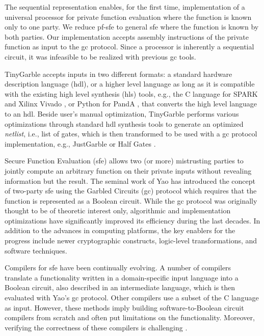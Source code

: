 The sequential representation enables, for the first time, implementation of a universal processor for private function evaluation where the function is known only to one party.
We reduce \acrfull{pf-sfe} to general \acrshort{sfe} where the function is known by both parties.
Our implementation accepts assembly instructions of the private function as input to the \acrshort{gc} protocol.
Since a processor is inherently a sequential circuit, it was infeasible to be realized with previous \acrshort{gc} tools.

TinyGarble accepts inputs in two different formats: a standard hardware description language (\acrshort{hdl}), or a higher level language as long as it is compatible with the existing high level synthesis (\acrshort{hls}) tools, e.g., the C language for  SPARK \cite{Gupta2004} and Xilinx Vivado \cite{tool:Vivado}, or Python for PandA \cite{tool:PandA}, that converts the high level language to an \acrshort{hdl}.
Beside user's manual optimization, TinyGarble performs various optimizations through standard \acrshort{hdl} synthesis tools to generate an optimized \emph{netlist}, i.e., list of gates, which is then transformed to be used with a \acrshort{gc} protocol implementation, e.g., JustGarble \cite{bellare2013efficient} or Half Gates \cite{zahur2015two}.


Secure Function Evaluation (\acrshort{sfe}) allows two (or more) mistrusting parties to jointly compute an arbitrary function on their private inputs without revealing information but the result. The seminal work of Yao \cite{yao1986generate} has introduced the concept of two-party \acrshort{sfe} using the Garbled Circuits (\acrshort{gc}) protocol which requires that the function is represented as a Boolean circuit. While the \acrshort{gc} protocol was originally thought to be of theoretic interest only, algorithmic and implementation optimizations have significantly improved its efficiency during the last decades. In addition to the advances in computing platforms, the key enablers for the progress include newer cryptographic constructs, logic-level transformations, and software techniques.

Compilers for \acrshort{sfe} have been continually evolving. A number of compilers~\cite{malkhi2004fairplay,ben2008fairplaymp,henecka2010tasty,kreuter2012billion} translate a functionality written in a domain-specific input language into a Boolean circuit, also described in an intermediate language, which is then evaluated with Yao's \acrshort{gc} protocol. Other compilers \cite{franz2014cbmc,kreuter2013pcf} use a subset of the C language as input. However, these methods imply building software-to-Boolean circuit compilers from scratch and often put limitations on the functionality. Moreover, verifying the correctness of these compilers is challenging \cite{mood2016frigate}.

